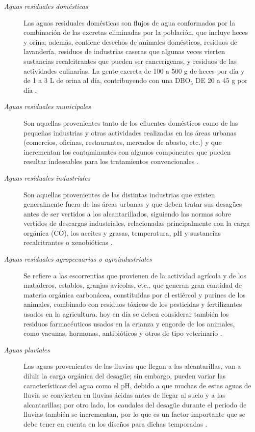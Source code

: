 \begin{description}
\item[\textit{Aguas residuales domésticas}]
Las aguas residuales domésticas son flujos de agua conformados por la combinación de las excretas eliminadas por la población, que incluye heces y orina; además, contiene desechos de animales domésticos, residuos de lavandería, residuos de industrias caseras que algunas veces vierten sustancias recalcitrantes que pueden ser cancerígenas, y residuos de las actividades culinarias. La gente excreta de 100 a 500 g de heces por día y de 1 a 3 L de orina al día, contribuyendo con una DBO$_{5}$ DE 20 a 45 g por día \citep{carreno17}. 
\item[\textit{Aguas residuales municipales}]
Son aquellas provenientes tanto de los efluentes domésticos como de las pequeñas industrias y otras actividades realizadas en las áreas urbanas (comercios, oficinas, restaurantes, mercados de abasto, etc.) y que incrementan los contaminantes con algunos componentes que pueden resultar indeseables para los tratamientos convencionales \citep{carreno17}.
\item[\textit{Aguas residuales industriales}]
Son aquellas provenientes de las distintas industrias que existen generalmente fuera de las áreas urbanas y que deben tratar sus desagües antes de ser vertidos a los alcantarillados, siguiendo las normas sobre vertidos de descargas industriales, relacionadas principalmente con la carga orgánica (CO), los aceites y grasas, temperatura, pH y sustancias recalcitrantes o xenobióticas \citep{carreno17}.
\item[\textit{Aguas residuales agropecuarias o agroindustriales}]
Se refiere a las escorrentías que provienen de la actividad agrícola y de los mataderos, establos, granjas avícolas, etc., que generan gran cantidad de materia orgánica carbonácea, constituidas por el estiércol y purines de los animales, combinado con residuos tóxicos de los pesticidas y fertilizantes usados en la agricultura. hoy en día se deben considerar también los residuos farmacéuticos usados  en la crianza y engorde de los animales, como vacunas, hormonas, antibióticos y otros de tipo veterinario \citep{carreno17}.
\item[\textit{Aguas pluviales}]
Las aguas provenientes de las lluvias que llegan a las alcantarillas, van a diluir la carga orgánica del desagüe; sin embargo, pueden variar las características del agua como el pH, debido a que muchas de estas aguas de lluvia se convierten en lluvias ácidas antes de llegar al suelo y a las alcantarillas; por otro lado, los caudales del desagüe durante el periodo de lluvias también se incrementan, por lo que es un factor importante que se debe tener en cuenta en los diseños para dichas temporadas \citep{carreno17}.
\end{description}

